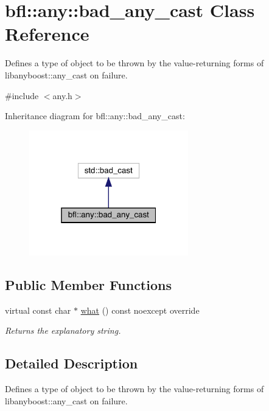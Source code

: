 \hypertarget{classbfl_1_1any_1_1bad__any__cast}{}\section{bfl\+:\+:any\+:\+:bad\+\_\+any\+\_\+cast Class Reference}
\label{classbfl_1_1any_1_1bad__any__cast}


Defines a type of object to be thrown by the value-\/returning forms of libanyboost\+::any\+\_\+cast on failure.  




{\ttfamily \#include $<$any.\+h$>$}



Inheritance diagram for bfl\+:\+:any\+:\+:bad\+\_\+any\+\_\+cast\+:
\nopagebreak
\begin{figure}[H]
\begin{center}
\leavevmode
\includegraphics[width=196pt]{classbfl_1_1any_1_1bad__any__cast__inherit__graph}
\end{center}
\end{figure}
\subsection*{Public Member Functions}
\begin{DoxyCompactItemize}
\item 
virtual const char $\ast$ \mbox{\hyperlink{classbfl_1_1any_1_1bad__any__cast_a5e59fa8f7c57b8a06fb35bf66dd887eb}{what}} () const noexcept override
\begin{DoxyCompactList}\small\item\em Returns the explanatory string. \end{DoxyCompactList}\end{DoxyCompactItemize}


\subsection{Detailed Description}
Defines a type of object to be thrown by the value-\/returning forms of libanyboost\+::any\+\_\+cast on failure. 


